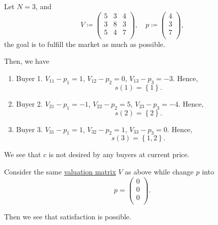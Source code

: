 \begin{eg}
	Let \(N = 3\), and
	\[
		V\coloneqq \begin{pmatrix}
			5 & 3 & 4 \\
			3 & 8 & 3 \\
			5 & 4 & 7 \\
		\end{pmatrix}, \quad p \coloneqq \begin{pmatrix}
			4 \\
			3 \\
			7 \\
		\end{pmatrix},
	\]
	the goal is to fulfill the market as much as possible.
\end{eg}
\begin{explanation}
	Then, we have
	\begin{enumerate}
		\item Buyer 1. \(V_{11}-p_1 = 1\), \(V_{12} - p_2 = 0\), \(V_{13} - p_3 = -3\). Hence,
		      \[
			      s(1) = \left\{1\right\}.
		      \]
		\item Buyer 2. \(V_{21}-p_1 = -1\), \(V_{22} - p_2 = 5\), \(V_{23} - p_3 = -4\). Hence,
		      \[
			      s(2) = \left\{2\right\}.
		      \]
		\item Buyer 3. \(V_{31}-p_1 = 1\), \(V_{32} - p_2 = 1\), \(V_{33} - p_3 = 0\). Hence,
		      \[
			      s(3) = \left\{1, 2\right\}.
		      \]
	\end{enumerate}
	We see that \(c\) is not desired by any buyers at current price.
	\begin{figure}[H]
		\centering
		\label{fig:satisfaction-eg-1}
	\end{figure}
\end{explanation}

\begin{eg}
	Consider the same \hyperref[def:valuation-matrix]{valuation matrix} \(V\) as above while change \(p\) into
	\[
		p = \begin{pmatrix}
			0 \\
			0 \\
			0 \\
		\end{pmatrix}.
	\]
\end{eg}
\begin{explanation}
	Then we see that satisfaction is possible.
	\begin{figure}[H]
		\centering
		\label{fig:satisfaction-eg-2}
	\end{figure}
\end{explanation}

